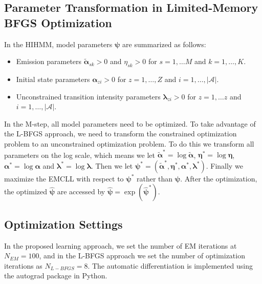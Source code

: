 \documentclass{article}
\begin{document}
\subsection{Parameter Transformation in Limited-Memory BFGS Optimization} \label{sec:pars_transformation}
In the HIHMM, model parameters $\bm \psi$ are summarized as follows:
\begin{itemize}
	\item Emission parameters $\tilde{\bm \alpha}_{sk} > 0$ and $\eta_{sk} > 0$ for $s = 1, \ldots M$ and $k = 1,\ldots, K$.
	\item Initial state parameters $\bm \alpha_{zi} > 0$ for $z = 1,\ldots, Z$ and $i = 1, \ldots, |\mathcal{A}|$.
	\item Unconstrained transition intensity parameters $\bm \lambda_{zi} > 0$ for $z = 1,\ldots z$ and $i = 1, \ldots, |\mathcal{A}|$.
\end{itemize}

In the M-step, all model parameters need to be optimized. To take advantage of the L-BFGS approach, we need to transform the constrained optimization problem to an unconstrained optimization problem. To do this we transform all parameters on the log scale, which means we let $\tilde{\bm \alpha}^* = \log {\tilde{\bm \alpha}}$, $\bm\eta^* = \log \bm \eta$, $\bm \alpha^* = \log \bm \alpha$ and $\bm \lambda^* = \log \bm \lambda$. Then we let $\bm \psi^* = (\tilde{\bm \alpha}^*, \bm \eta^*, \bm \alpha^*, \bm \lambda^*)$. Finally we maximize the EMCLL with respect to $\bm \psi^*$ rather than $\bm \psi$. After the optimization, the optimized $\hat{\bm \psi}$ are accessed by $\hat{\bm \psi} = \exp(\hat{\bm \psi}^*)$.

\subsection{Optimization Settings} \label{sec:opt_set}
In the proposed learning approach, we set the number of EM iterations at $N_{EM} = 100$, and in the L-BFGS approach we set the number of optimization iterations as $N_{L-BFGS} = 8$. The automatic differentiation is implemented using the autograd package \cite{Maclaurin_2016} in Python.
\end{document}
